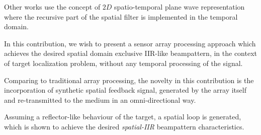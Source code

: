\documentclass[conference]{IEEEtran}
\begin{document}
\par Other works \cite{Madanayake2008AFilters,Madanayake2008ABeamformer} use the concept of $2D$ spatio-temporal plane wave representation where the recursive part of the spatial filter is implemented in the temporal domain. 
\par In this contribution, we wish to present a sensor array processing approach which achieves the desired spatial domain exclusive IIR-like beampattern, in the context of target localization problem, without any temporal processing of the signal.
\par Comparing to traditional array processing, the novelty in this contribution is the incorporation of synthetic spatial feedback signal, generated by the array itself and re-transmitted to the medium in an omni-directional way. 
\par Assuming a reflector-like behaviour of the target, a spatial loop is generated, which is shown to achieve the desired \textit{spatial-IIR} beampattern characteristics.
\end{document}
